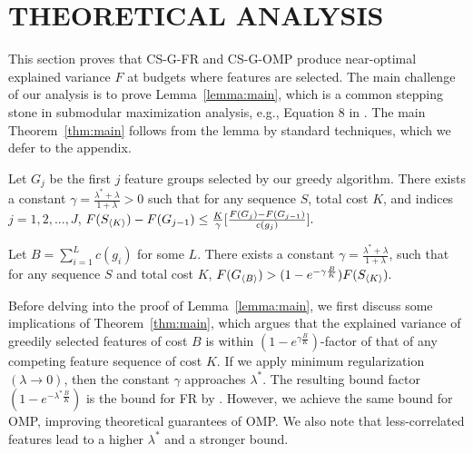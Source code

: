 \section{THEORETICAL ANALYSIS}
\label{sec:proof}

This section proves that CS-G-FR and CS-G-OMP 
produce near-optimal explained variance $F$ at budgets 
where features are selected. The main challenge of our analysis is to prove Lemma~\ref{lemma:main},
which is a common stepping stone in 
submodular maximization analysis, e.g., Equation 8 in \citep{submodular}. The main Theorem~\ref{thm:main} follows from the lemma by standard techniques, which we defer to the appendix. 

\begin{lemma}[main]
  Let $G_j$ be the first $j$ feature groups selected by our greedy algorithm. There exists a constant $\gamma = \frac{\lambda^* + \lambda}{1 +\lambda} > 0$ such that for any sequence $S$, total cost $K$, and indices $j=1,2,..., J$, 
  \mbox{$
    F(S_{\langle K \rangle}) - F(G_{j-1}) \leq \frac{K}{\gamma}
      \lbrack \frac{F(G_j) - F(G_{j-1})}{c(g_j)} \rbrack.
  $}
  \label{lemma:main}
\end{lemma}


\begin{theorem}
Let $B = \sum _{i=1}^L c(g_i)$ for some $L$.  
There exists a constant  
  $\gamma = \frac{\lambda^* + \lambda}{1+\lambda}$, 
  such that
for any sequence $S$ and total cost $K$, 
\mbox{$
  F(G_{\langle B \rangle}) > (1 - e^{-\gamma\frac{B}{K}})F(S_{\langle K \rangle}).
$}
\label{thm:main}
\end{theorem}

%
Before delving into the proof of Lemma~\ref{lemma:main}, we first discuss 
some implications of Theorem~\ref{thm:main}, which 
argues that the explained variance of greedily selected
features of cost $B$ is within $(1-e^{\gamma \frac{B}{K}})$-factor
of that of any competing feature sequence of cost $K$.
If we apply minimum regularization $(\lambda \rightarrow 0)$, then 
the constant $\gamma$ approaches $\lambda^*$. The resulting bound factor $(1-e^{ - \lambda^* \frac{B}{K}})$ is the bound for FR by \cite{kemp}. However, we achieve the same bound for OMP, improving
theoretical guarantees of OMP. We also note that less-correlated features lead
to a higher $\lambda^*$  and a stronger bound. 


